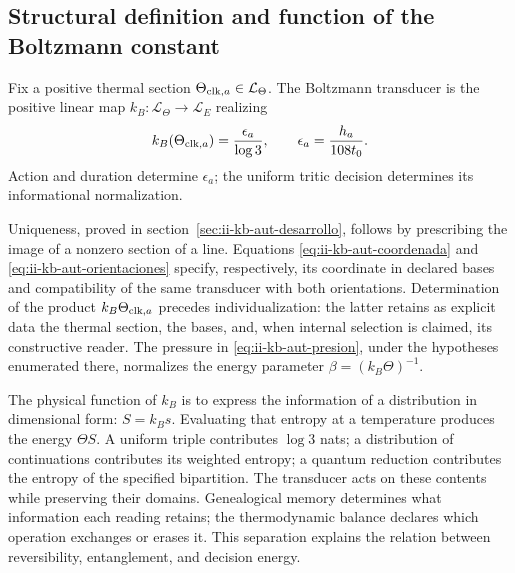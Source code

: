 \subsection{Structural definition and function of the Boltzmann constant}
\label{sec:ii-definicion-boltzmann}

\begin{definition}
Fix a positive thermal section
\(\Theta_{{\rm clk},a}\in\mathcal L_\Theta\). The Boltzmann
transducer is the positive linear map
\(k_B:\mathcal L_\Theta\to\mathcal L_E\) realizing
\begin{equation}
 k_B(\Theta_{{\rm clk},a})
 =\frac{\epsilon_a}{\log3},
 \qquad \epsilon_a=\frac{h_a}{108t_0}.
 \label{eq:ii-definicion-boltzmann-transductor}
\end{equation}
Action and duration determine \(\epsilon_a\); the uniform
tritic decision determines its informational normalization.
\end{definition}

Uniqueness, proved in section~\ref{sec:ii-kb-aut-desarrollo},
follows by prescribing the image of a nonzero section of a line.
Equations \eqref{eq:ii-kb-aut-coordenada} and
\eqref{eq:ii-kb-aut-orientaciones} specify, respectively, its
coordinate in declared bases and compatibility of the same
transducer with both orientations. Determination of the product
\(k_B\Theta_{{\rm clk},a}\) precedes individualization:
the latter retains as explicit data the thermal section, the
bases, and, when internal selection is claimed, its constructive reader.
The pressure in \eqref{eq:ii-kb-aut-presion}, under the hypotheses
enumerated there, normalizes the energy parameter
\(\beta=(k_B\Theta)^{-1}\).

The physical function of \(k_B\) is to express
the information of a distribution in dimensional form: \(S=k_Bs\). Evaluating that
entropy at a temperature produces the energy \(\Theta S\).
A uniform triple contributes \(\log3\) nats; a distribution of
continuations contributes its weighted entropy; a quantum reduction
contributes the entropy of the specified bipartition. The transducer
acts on these contents while preserving their domains. Genealogical
memory determines what information each reading retains; the
thermodynamic balance declares which operation exchanges or
erases it. This separation explains the relation between reversibility,
entanglement, and decision energy.
